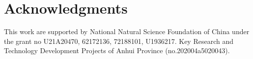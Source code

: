 \documentclass[letterpaper]{article} %
\begin{document}
\section{Acknowledgments}
This work are supported by National Natural Science Foundation of China under the grant no U21A20470, 62172136, 72188101, U1936217. Key Research and Technology Development Projects of Anhui Province (no.202004a5020043).













\end{document}

